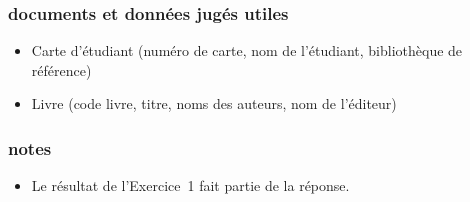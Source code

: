 \subsubsection*{documents et données jugés utiles}
\begin{itemize}
    \item Carte d'étudiant (numéro de carte, nom de l'étudiant, bibliothèque de référence)
    \item Livre (code livre, titre, noms des auteurs, nom de l'éditeur)
\end{itemize}

\subsubsection*{notes}
\begin{itemize}
    \item Le résultat de l'Exercice~1 fait partie de la réponse.
\end{itemize}
